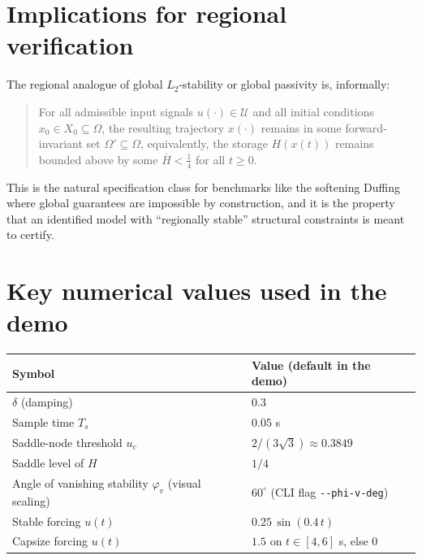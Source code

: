 \documentclass[11pt]{article}
\begin{document}
\section{Implications for regional verification}

The regional analogue of global $L_2$-stability or global passivity
is, informally:

\begin{quote}
For all admissible input signals $u(\cdot)\in\mathcal U$ and all
initial conditions $x_0 \in X_0 \subseteq \Omega$, the resulting
trajectory $x(\cdot)$ remains in some forward-invariant set
$\Omega' \subseteq \Omega$, equivalently, the storage $H(x(t))$
remains bounded above by some $\overline H < \tfrac{1}{4}$ for all
$t \ge 0$.
\end{quote}

This is the natural specification class for benchmarks like the
softening Duffing where global guarantees are impossible by
construction, and it is the property that an identified model with
``regionally stable'' structural constraints is meant to certify.

\appendix
\section{Key numerical values used in the demo}

\begin{tabular}{ll}
\hline
Symbol & Value (default in the demo) \\
\hline
$\delta$ (damping)              & $0.3$ \\
Sample time $T_s$               & $0.05$ s \\
Saddle-node threshold $u_c$     & $2/(3\sqrt{3}) \approx 0.3849$ \\
Saddle level of $H$             & $1/4$ \\
Angle of vanishing stability $\varphi_v$ (visual scaling)
                                & $60^\circ$ (CLI flag \verb|--phi-v-deg|) \\
Stable forcing $u(t)$           & $0.25\,\sin(0.4\,t)$ \\
Capsize forcing $u(t)$          & $1.5$ on $t\in[4,6]$ s, else $0$ \\
\hline
\end{tabular}
\end{document}
